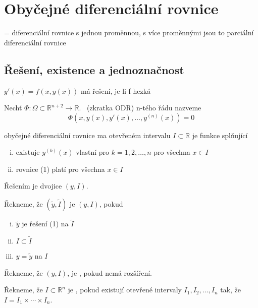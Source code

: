 
\section{Obyčejné diferenciální rovnice}
= diferenciální rovnice s jednou proměnnou, s více proměnnými jsou to parciální diferenciální rovnice

\subsection{Řešení, existence a jednoznačnost}
\(y'(x) = f(x, y(x))\) má řešení, je-li f hezká

\begin{definice}
	Nechť \(\Phi : \Omega \subset \mathbb{R}^{n+2} \to \mathbb{R}\).\  (zkratka ODR) 
	n-tého řádu nazveme 
\begin{equation}
	\Phi(x, y(x), y'(x), \ldots, y^{(n)}(x)) = 0
\end{equation}
\end{definice}

\begin{definice}
	 obyčejné diferenciální rovnice ma otevřeném intervalu $I \subset \mathbb{R}$ je funkce splňující
\begin{enumerate}[(i)]
	\item existuje $y^{(k)}(x)$ vlastní pro $k = 1, 2, \ldots, n$ pro všechna $x \in I$ 
	\item rovnice (1) platí pro všechna $x \in I$
\end{enumerate}
	Řešením je dvojice $(y, I)$.
\end{definice}

\begin{definice}
	Řekneme, že $(\tilde{y}, \tilde{I})$ je  $(y, I)$, pokud
\begin{enumerate}[(i)]
	\item $\tilde{y}$ je řešení (1) na $\tilde{I}$
	\item $I \subset \tilde{I}$
	\item $y = \tilde{y}$ na $I$
\end{enumerate}
	Řekneme, že $(y, I)$, je , pokud nemá rozšíření.
\end{definice}

\begin{definice}
	Řekneme, že $I \subset \mathbb{R}^{n}$ je , pokud existují otevřené
	intervaly $I_1, I_2, \ldots, I_n$ tak, že $I = I_1 \times \cdots \times I_n$.
\end{definice}

